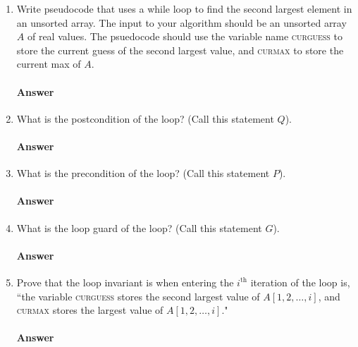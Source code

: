 \documentclass{article}
\begin{document}
\begin{enumerate}

    \item Write pseudocode that uses a while loop to find the second largest
        element in an unsorted array.  The input to your algorithm should be an
        unsorted array $A$ of real values.  The psuedocode should use the
        variable name \textsc{curguess} to store the current guess of the second
        largest value, and \textsc{curmax} to store the current max of $A$.

        \paragraph{Answer}


    \item What is the postcondition of the loop? (Call this statement $Q$).

        \paragraph{Answer}


    \item What is the precondition of the loop? (Call this statement $P$).

        \paragraph{Answer}


    \item What is the loop guard of the loop? (Call this statement $G$).

        \paragraph{Answer}


    \item Prove that the loop invariant is when entering the $i^\text{th}$
        iteration of the loop is, ``the variable \textsc{curguess} stores
        the second
        largest value of $A[1,2, \ldots, i]$,
        and \textsc{curmax} stores the largest value of $A[1,2,\ldots, i]$."

        \paragraph{Answer}


\end{enumerate}
\end{document}

